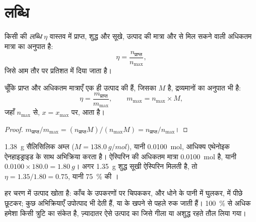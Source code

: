\section{लब्धि}

\begin{definition}[लब्धि]\label{def:g10:synthesis-yield:yield}
किसी  की \emph{लब्धि} $\eta$ वास्तव में प्राप्त, शुद्ध और
सूखे, उत्पाद की मात्रा और  से मिल सकने वाली अधिकतम मात्रा का
अनुपात है:
\[
  \eta = \frac{n_{\text{प्राप्त}}}{n_{\max}} ,
\]
जिसे आम तौर पर प्रतिशत में दिया जाता है।
\end{definition}

\begin{proposition}[द्रव्यमानों से लब्धि]\label{prop:g10:synthesis-yield:masses}
चूँकि प्राप्त और अधिकतम मात्राएँ एक ही उत्पाद की हैं, जिसका  $M$ है,  द्रव्यमानों का अनुपात भी है:
\[
  \eta = \frac{m_{\text{प्राप्त}}}{m_{\max}},
  \qquad m_{\max} = n_{\max} \times M,
\]
जहाँ $n_{\max}$  से, $x = x_{\max}$ पर, आता है।
\end{proposition}

\begin{proof}
$m_{\text{प्राप्त}} / m_{\max} = (n_{\text{प्राप्त}} M) / (n_{\max} M)
= n_{\text{प्राप्त}} / n_{\max}$।
\end{proof}

\begin{example}[एक छोटे संश्लेषण की लब्धि]\label{ex:g10:synthesis-yield:small}
\qty{1.38}{g} सैलिसिलिक अम्ल ($M = \qty{138.0}{g/mol}$), यानी
\qty{0.0100}{mol}, आधिक्य एथेनोइक ऐनहाइड्राइड के साथ अभिक्रिया करता है। ऐस्पिरिन की
अधिकतम मात्रा \qty{0.0100}{mol} है, यानी
$0.0100 \times 180.0 = \qty{1.80}{g}$। अगर \qty{1.35}{g} शुद्ध सूखी
ऐस्पिरिन मिलती है, तो $\eta = 1.35 / 1.80 = 0.75$, यानी
\qty{75}{\percent} की ।
\end{example}

\begin{remark}[लब्धि 100 \% से कम क्यों होती है]\label{rem:g10:synthesis-yield:below}
हर चरण में उत्पाद खोता है: काँच के उपकरणों पर चिपककर,  और धोने के पानी में
घुलकर,  में पीछे छूटकर; कुछ अभिक्रियाएँ उपोत्पाद भी देती हैं, या  के खपने से पहले रुक जाती हैं। \qty{100}{\percent} से अधिक  हमेशा किसी
त्रुटि का संकेत है, ज़्यादातर ऐसे उत्पाद का जिसे गीला या अशुद्ध रहते
तौल लिया गया।
\end{remark}

